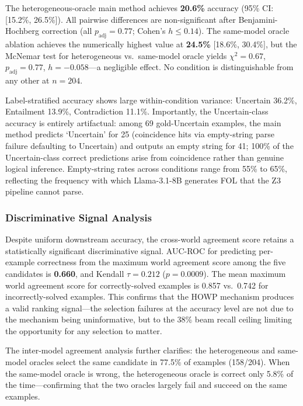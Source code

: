 \documentclass[11pt,letterpaper]{article}
\begin{document}
The heterogeneous-oracle main method achieves \textbf{20.6\%} accuracy (95\% CI: [15.2\%, 26.5\%]). All pairwise differences are non-significant after Benjamini-Hochberg correction (all $p_{\text{adj}} = 0.77$; Cohen's $h \leq 0.14$). The same-model oracle ablation achieves the numerically highest value at \textbf{24.5\%} [18.6\%, 30.4\%], but the McNemar test for heterogeneous vs.\ same-model oracle yields $\chi^2 = 0.67$, $p_{\text{adj}} = 0.77$, $h = -0.058$---a negligible effect. No condition is distinguishable from any other at $n{=}204$.

Label-stratified accuracy shows large within-condition variance: Uncertain 36.2\%, Entailment 13.9\%, Contradiction 11.1\%. Importantly, the Uncertain-class accuracy is entirely artifactual: among 69 gold-Uncertain examples, the main method predicts `Uncertain' for 25 (coincidence hits via empty-string parse failure defaulting to Uncertain) and outputs an empty string for 41; 100\% of the Uncertain-class correct predictions arise from coincidence rather than genuine logical inference. Empty-string rates across conditions range from 55\% to 65\%, reflecting the frequency with which Llama-3.1-8B generates FOL that the Z3 pipeline cannot parse.

\subsubsection{Discriminative Signal Analysis}
\label{sec:exp1-signal}

Despite uniform downstream accuracy, the cross-world agreement score retains a statistically significant discriminative signal. AUC-ROC for predicting per-example correctness from the maximum world agreement score among the five candidates is \textbf{0.660}, and Kendall $\tau = 0.212$ ($p = 0.0009$). The mean maximum world agreement score for correctly-solved examples is 0.857 vs.\ 0.742 for incorrectly-solved examples. This confirms that the HOWP mechanism produces a valid ranking signal---the selection failures at the accuracy level are not due to the mechanism being uninformative, but to the 38\% beam recall ceiling limiting the opportunity for any selection to matter.

The inter-model agreement analysis further clarifies: the heterogeneous and same-model oracles select the same candidate in 77.5\% of examples (158/204). When the same-model oracle is wrong, the heterogeneous oracle is correct only 5.8\% of the time---confirming that the two oracles largely fail and succeed on the same examples.
\end{document}

